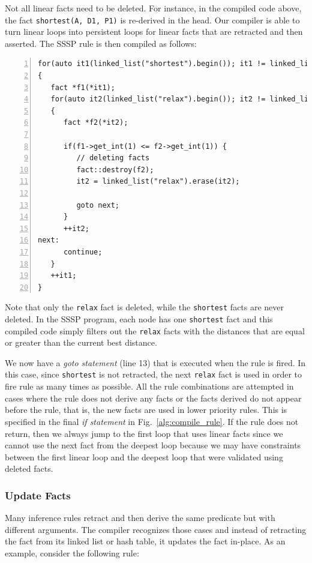 Not all linear facts need to be deleted. For instance, in the compiled code
above, the fact \texttt{shortest(A, D1, P1)} is re-derived in the head. Our
compiler is able to turn linear loops into persistent loops for linear facts that are
retracted and then asserted.  The SSSP rule is then compiled as
follows:

\begin{Verbatim}[numbers=left,fontsize=\scriptsize]
for(auto it1(linked_list("shortest").begin()); it1 != linked_list("shortest").end(); )
{
   fact *f1(*it1);
   for(auto it2(linked_list("relax").begin()); it2 != linked_list("relax").end(); )
   {
      fact *f2(*it2);

      if(f1->get_int(1) <= f2->get_int(1)) {
         // deleting facts
         fact::destroy(f2);
         it2 = linked_list("relax").erase(it2);

         goto next;
      }
      ++it2;
next:
      continue;
   }
   ++it1;
}
\end{Verbatim}

Note that only the \texttt{relax} fact is deleted, while the \texttt{shortest}
facts are never deleted. In the SSSP program, each node has one
\texttt{shortest} fact and this compiled code simply filters out the
\texttt{relax} facts with the distances that are equal or greater
than the current best distance.

We now have a \emph{goto statement} (line 13) that is executed when the rule is fired.
In this case, since \texttt{shortest} is not retracted, the next \texttt{relax}
fact is used in order to fire rule as many times as possible. All the rule
combinations are attempted in cases where the rule does not derive any facts or
the facts derived do not appear before the rule, that is, the new facts are used in
lower priority rules. This is specified in the final \emph{if statement} in
Fig.~\ref{alg:compile_rule}. If the rule does not return, then we always jump to
the first loop that uses linear facts since we cannot use the next fact from the
deepest loop because we may have constraints between the first linear loop and
the deepest loop that were validated using deleted facts.

\subsubsection{Update Facts}

Many inference rules retract and then derive the same predicate but with
different arguments. The compiler recognizes those cases and instead of
retracting the fact from its linked list or hash table, it updates the fact
in-place. As an example, consider the following rule:

